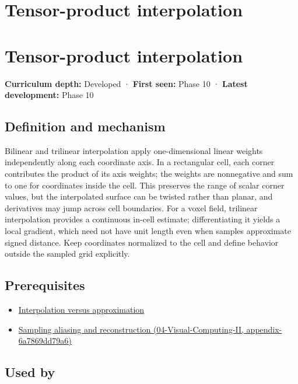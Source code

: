 \hypertarget{appendix-0a09b6dfdc86}{}
\section*{Tensor-product interpolation}
\section{Tensor-product interpolation}\label{appendix-0a09b6dfdc86-tensor-product-interpolation}

\textbf{Curriculum depth:} Developed · \textbf{First seen:} Phase 10 · \textbf{Latest development:} Phase 10

\subsection{Definition and mechanism}\label{appendix-0a09b6dfdc86-definition-and-mechanism}

Bilinear and trilinear interpolation apply one-dimensional linear weights independently along each coordinate axis. In a rectangular cell, each corner contributes the product of its axis weights; the weights are nonnegative and sum to one for coordinates inside the cell. This preserves the range of scalar corner values, but the interpolated surface can be twisted rather than planar, and derivatives may jump across cell boundaries. For a voxel field, trilinear interpolation provides a continuous in-cell estimate; differentiating it yields a local gradient, which need not have unit length even when samples approximate signed distance. Keep coordinates normalized to the cell and define behavior outside the sampled grid explicitly.

\subsection{Prerequisites}\label{appendix-0a09b6dfdc86-prerequisites}

\begin{itemize}
\tightlist
\item
  \hyperref[appendix-0c2a5f69851e]{Interpolation versus approximation}
\item
  \href{../04-Visual-Computing-II/main.pdf\#nameddest=appendix-6a7869dd79a6}{Sampling aliasing and reconstruction (04-Visual-Computing-II, appendix-6a7869dd79a6)}
\end{itemize}

\subsection{Used by}\label{appendix-0a09b6dfdc86-used-by}

